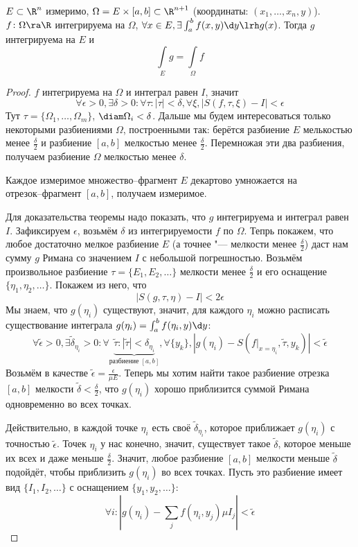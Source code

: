 \begin{theorem}
	$E \subset \R^n$ измеримо, $\Omega = E \times [a, b] \subset \R^{n+1}$ (координаты: $(x_1, \dots, x_n, y)$).
	$f\colon \Omega \ra \R$ интегрируема на $\Omega$, $\forall x \in E, \exists \int_a^b f(x,y) \d y \lrh g(x)$.
	Тогда $g$ интегрируема на $E$ и
	\[ \int\limits_E g = \int\limits_\Omega f \]
\end{theorem}
\begin{proof}
	$f$ интегрируема на $\Omega$ и интеграл равен $I$, значит
	\[
		\forall \epsilon > 0, \exists \delta > 0\colon \forall \tau\colon |\tau| < \delta,
		\forall \xi, \left|S(f,\tau,\xi) - I\right| < \epsilon
	\]
	Тут $\tau = \{\Omega_1, \dots, \Omega_m\}$, $\diam \Omega_i < \delta$.
	Дальше мы будем интересоваться только некоторыми разбиениями $\Omega$, построенными так:
	берётся разбиение $E$ мелькостью менее $\frac\delta2$ и разбиение $[a, b]$ мелкостью менее $\frac\delta 2$.
	Перемножая эти два разбиения, получаем разбиение $\Omega$ мелкостью менее $\delta$.
	\begin{Rem}
		Каждое измеримое множество--фрагмент $E$ декартово умножается на \\отрезок--фрагмент $[a, b]$, получаем измеримое.
	\end{Rem}

	Для доказательства теоремы надо показать, что $g$ интегрируема и интеграл равен $I$.
	Зафиксируем $\epsilon$, возьмём $\delta$ из интегрируемости $f$ по $\Omega$.
	Тепрь покажем, что любое достаточно мелкое разбиение $E$ (а точнее "--- мелкости менее $\frac\delta 2$) даст нам сумму $g$ Римана со значением $I$ с небольшой погрешностью.
	Возьмём произвольное разбиение $\tau = \{E_1, E_2, \dots\}$ мелкости менее $\frac\delta2$ и его оснащение $\{\eta_1, \eta_2, \dots\}$.
	Покажем из него, что
	\[
		\left| S(g, \tau, \eta) - I \right| < 2\epsilon
	\]
	Мы знаем, что $g(\eta_i)$ существуют, значит, для каждого $\eta_i$ можно расписать существование интеграла $g(\eta_i)=\int_a^b f(\eta_i, y)\d y$:
	\[
		\forall \tilde\epsilon>0, \exists \tilde\delta_{\eta_i} > 0\colon \forall \underbrace{\tilde\tau\colon |\tilde\tau| < \delta_{\eta_i}}_{\text{разбиение }[a, b]},
		\forall \{y_k\}, \left| g(\eta_i) - S(f|_{x=\eta_i}, \tilde\tau, y_k) \right| < \tilde\epsilon
	\]
	Возьмём в качестве $\tilde\epsilon = \frac\epsilon{\mu E}$.
	Теперь мы хотим найти такое разбиение отрезка $[a, b]$ мелкости $\tilde\delta < \frac\delta 2$, что $g(\eta_i)$ хорошо приблизится суммой Римана одновременно во всех точках.

	Действительно, в каждой точке $\eta_i$ есть своё $\tilde\delta_{\eta_i}$, которое приближает $g(\eta_i)$ с точностью $\tilde\epsilon$.
	Точек $\eta_i$ у нас конечно, значит, существует такое $\tilde\delta$, которое меньше их всех и даже меньше $\frac\delta2$.
	Значит, любое разбиение $[a, b]$ мелкости меньше $\tilde\delta$ подойдёт, чтобы приблизить $g(\eta_i)$ во всех точках.
	Пусть это разбиение имеет вид $\{I_1, I_2, \dots\}$ с оснащением $\{y_1, y_2, \dots\}$:
	\[
		\forall i\colon \left| g(\eta_i) - \sum_j f(\eta_i, y_j) \mu I_j \right| < \tilde\epsilon
	\]


\end{proof}
